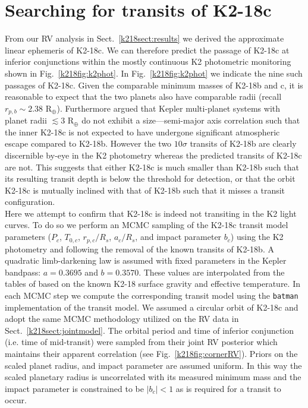 \section{Searching for transits of K2-18c} \label{k218sect:transit}
From our RV analysis in Sect.~\ref{k218sect:results} we derived the approximate linear ephemeris of
K2-18c. We can therefore predict the passage of K2-18c at inferior conjunctions within the
mostly continuous K2 photometric monitoring shown in Fig.~\ref{k218fig:k2phot}. In
Fig.~\ref{k218fig:k2phot} we indicate the nine such passages of K2-18c. Given the comparable minimum masses of
K2-18b and c, it is reasonable to expect that the two planets also have comparable radii (recall
$r_{p,b} \sim 2.38$ R$_{\oplus}$). Furthermore \citep{ciardi13} argued that Kepler multi-planet
systems with planet radii $\lesssim 3$ R$_{\oplus}$ do not exhibit a size---semi-major axis
correlation such that the inner K2-18c is not expected to have undergone significant atmospheric
escape compared to K2-18b. However the two $10\sigma$ transits of K2-18b
are clearly discernible by-eye in the K2 photometry whereas the predicted transits of K2-18c
are not. This suggests that either K2-18c is much smaller than K2-18b such that its resulting
transit depth is below the threshold for detection, or that
the orbit K2-18c is mutually inclined with that of K2-18b such that it misses a transit configuration. \\

Here we attempt to confirm that K2-18c is indeed not transiting in the K2 light curves. To do so
we perform an MCMC sampling of the K2-18c transit
model parameters ($P_c$, $T_{0,c}$, $r_{p,c}/R_s$, $a_c/R_s$, and impact parameter $b_c$)
using the K2 photometry and
following the removal of the known transits of K2-18b. A quadratic limb-darkening law is
assumed with fixed parameters in the Kepler bandpass: $a=0.3695$ and $b=0.3570$. These values
are interpolated from the tables of
\cite{claret11} based on the known K2-18 surface gravity and effective temperature. 
In each MCMC step we compute the corresponding transit model using the \texttt{batman} implementation
\citep{kreidberg15} of the \cite{mandel02} transit model.
We assumed a circular orbit of K2-18c and adopt the same MCMC methodology
utilized on the RV data in Sect.~\ref{k218sect:jointmodel}. The orbital period and time of inferior
conjunction (i.e. time of mid-transit) were sampled from their joint RV posterior which maintains
their apparent correlation (see Fig.~\ref{k218fig:cornerRV}). Priors on
the scaled planet radius, and impact parameter are assumed uniform. In this way
the scaled planetary radius is uncorrelated with its measured minimum mass and the impact parameter is
constrained to be $|b_c|<1$ as is required for a transit to occur. \\

